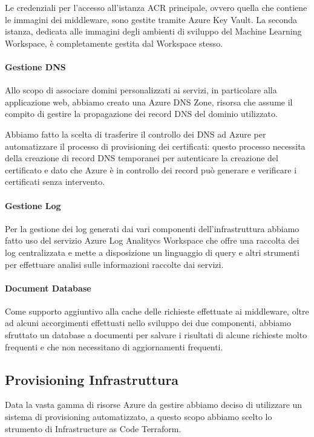 Le credenziali per l'accesso all'istanza ACR principale, ovvero quella che contiene le immagini dei middleware, sono gestite tramite Azure Key Vault. La seconda istanza, dedicata alle immagini degli ambienti di sviluppo del Machine Learning Workspace, è completamente gestita dal Workspace stesso.

\paragraph{Gestione DNS}
Allo scopo di associare domini personalizzati ai servizi, in particolare alla applicazione web, abbiamo creato una Azure DNS Zone, risorsa che assume il compito di gestire la propagazione dei record DNS del dominio utilizzato.

Abbiamo fatto la scelta di trasferire il controllo dei DNS ad Azure per automatizzare il processo di provisioning dei certificati: questo processo necessita della creazione di record DNS temporanei per autenticare la creazione del certificato e dato che Azure è in controllo dei record può generare e verificare i certificati senza intervento.

\paragraph{Gestione Log}
Per la gestione dei log generati dai vari componenti dell'infrastruttura abbiamo fatto uso del servizio Azure Log Analitycs Workspace che offre una raccolta dei log centralizzata e mette a disposizione un linguaggio di query e altri strumenti per effettuare analisi sulle informazioni raccolte dai servizi.

\paragraph{Document Database}
Come supporto aggiuntivo alla cache delle richieste effettuate ai middleware, oltre ad alcuni accorgimenti effettuati nello sviluppo dei due componenti, abbiamo sfruttato un database a documenti per salvare i risultati di alcune richieste molto frequenti e che non necessitano di aggiornamenti frequenti.

\subsection{Provisioning Infrastruttura}
Data la vasta gamma di risorse Azure da gestire abbiamo deciso di utilizzare un sistema di provisioning automatizzato, a questo scopo abbiamo scelto lo strumento di Infrastructure as Code Terraform.

